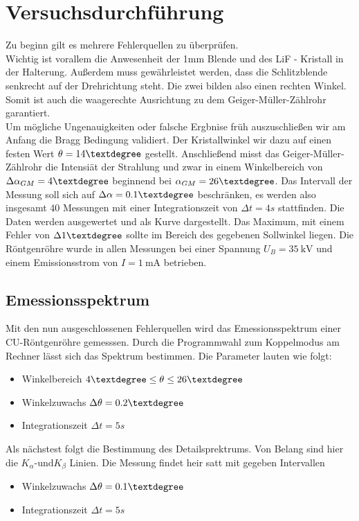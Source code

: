 \section{Versuchsdurchführung}
Zu beginn gilt es mehrere Fehlerquellen zu überprüfen. \\
Wichtig ist vorallem die Anwesenheit der 1mm Blende und des LiF - Kristall in der Halterung.
Außerdem muss gewährleistet werden, dass die Schlitzblende senkrecht auf der Drehrichtung steht. Die zwei bilden also einen rechten Winkel.
Somit ist auch die waagerechte Ausrichtung zu dem Geiger-Müller-Zählrohr garantiert. %
\\
\newline
Um mögliche Ungenauigkeiten oder falsche Ergbnise früh auszuschließen wir am Anfang die Bragg Bedingung %
validiert. Der Kristallwinkel wir dazu auf einen festen Wert $\theta = 14 \textdegree $  gestellt.
Anschließend misst das Geiger-Müller-Zählrohr die Intensiät der Strahlung und zwar in einem Winkelbereich von 
$\Delta \alpha_{GM} = 4 \textdegree$ beginnend bei $\alpha_{GM} = 26 \textdegree$. Das Intervall der Messung soll sich 
auf $\Delta \alpha = 0.1 \textdegree$ beschränken, es werden also insgesamt 40 Messungen mit einer Integrationszeit von $\Delta t = 4 \si{s}$ stattfinden. 
Die Daten werden ausgewertet und als Kurve dargestellt. Das Maximum, mit einem Fehler von $\Delta 1\textdegree$ sollte im Bereich des gegebenen Sollwinkel liegen.
Die Röntgenröhre wurde in allen Messungen bei einer Spannung $U_{B} = \SI{35}{\kilo\volt}$ und einem Emissionsstrom von $I = \SI{1}{\milli\ampere}$ betrieben.
\\
\newline
\subsection{Emessionsspektrum}
Mit den nun ausgeschlossenen Fehlerquellen wird das Emessionsspektrum einer CU-Röntgenröhre gemesssen.
Durch die Programmwahl zum Koppelmodus am Rechner lässt sich das Spektrum bestimmen.
Die Parameter lauten wie folgt:
\begin{itemize}
    \item{Winkelbereich   $4 \textdegree \leq \theta \leq 26 \textdegree $}
    \item{Winkelzuwachs $\Delta \theta = 0.2 \textdegree$}
    \item{Integrationszeit $\Delta t = 5 \si{s}$}
\end{itemize}
Als nächstest folgt die Bestimmung des Detailsprektrums. Von Belang sind hier die $K_{\alpha} \text{-und} K_{\beta}$ Linien. 
Die Messung findet heir satt mit gegeben Intervallen
\begin{itemize}
    \item{Winkelzuwachs $\Delta \theta = 0.1 \textdegree$}
    \item{Integrationszeit $\Delta t = 5 \si{s}$}
\end{itemize}

